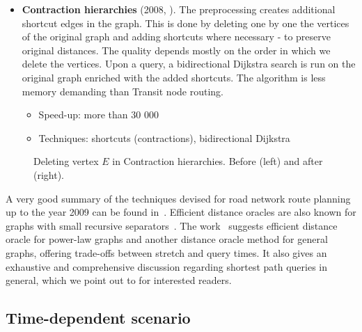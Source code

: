 \begin{itemize}
		\item \textbf{Contraction hierarchies} (2008, \cite{contracthier08}). The preprocessing creates additional shortcut edges in the graph. This is done by deleting one by one the vertices of the original graph and adding shortcuts where necessary - to preserve original distances. The quality depends mostly on the order in which we delete the vertices. Upon a query, a bidirectional Dijkstra search is run on the original graph enriched with the added shortcuts. The algorithm is less memory demanding than Transit node routing.
		\begin{itemize}
			\item Speed-up: more than 30 000
			\item Techniques: shortcuts (contractions), bidirectional Dijkstra
		\end{itemize}
	\end{itemize}
	\hspace{\fill}
	
	\begin{figure}[h!]
		\centering
	    \caption{\label{fig:contraction} Deleting vertex $E$ in Contraction hierarchies. Before (left) and after (right).}
		\end{figure}
	
	\noindent A very good summary of the techniques devised for road network route planning up to the year 2009 can be found in~\cite{engineeringroute09}. Efficient distance oracles are also known for graphs with small recursive separators~\cite{distlabel04}. The work~\cite{sommerthesis10} suggests efficient distance oracle for power-law graphs and another distance oracle method for general graphs, offering trade-offs between stretch and query times. It also gives an exhaustive and comprehensive discussion regarding shortest path queries in general, which we point out to for interested readers.
	
\subsection{Time-dependent scenario}
	
